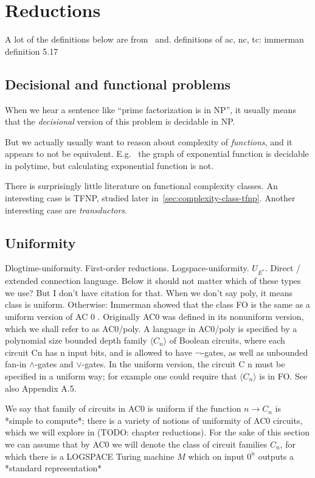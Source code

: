 \chapter{Reductions}
\label{chap:reductions}
A lot of the definitions below are from~\cite{10.5555/520668} and\cite{Immerman1999-IMMDC}.
definitions of ac, nc, tc:
immerman definition 5.17


\section{Decisional and functional problems}
When we hear a sentence like ``prime factorization is in NP'', it usually
means that the \emph{decisional} version of this problem is decidable in NP.

But we actually usually want to reason about complexity of \emph{functions},
and it appears to not be equivalent. E.g. \ the graph of exponential function is 
decidable in polytime, but calculating exponential function is not.

There is surprisingly little literature on functional complexity classes.
An interesting case is TFNP, studied later in~\ref{sec:complexity-class-tfnp}.
Another interesting case are \emph{transductors}.

\section{Uniformity}
Dlogtime-uniformity. First-order reductions. Logspace-uniformity. $U_{E^*}$. Direct / extended connection language.
Below it should not matter which of these types we use? But I don't have citation for that.
When we don't say poly, it means class is uniform. Otherwise: Immerman showed that the class FO is the same as a uniform version
of AC 0 . Originally AC0 was defined in its nonuniform version, which
we shall refer to as AC0/poly. A language in AC0/poly is specified by
a polynomial size bounded depth family $\langle C_n \rangle$ of Boolean circuits, where
each circuit Cn has n input bits, and is allowed to have ¬-gates, as well as
unbounded fan-in $\land$-gates and $\lor$-gates. In the uniform version, the circuit
C n must be specified in a uniform way; for example one could require that
$\langle C_n \rangle$ is in FO\@. See also Appendix A.5.

We say that family of circuits in AC0 is uniform if the function $n \rightarrow C_n$ is
 *simple to compute*; there is a variety of notions of uniformity of AC0 circuits, which
  we will explore in (TODO: chapter reductions). For the sake of this section we can assume
   that by AC0 we will denote the class of circuit families $C_n$, for which there is a 
   LOGSPACE Turing machine $M$ which on input $0^n$ outputs a *standard representation*


